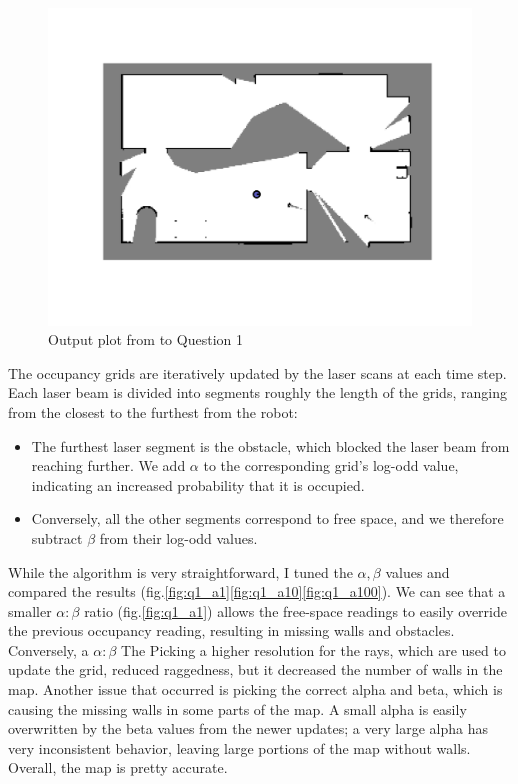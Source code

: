\documentclass{article} %
\begin{document}
\begin{figure}[hbt]
  \centering
    \includegraphics[width=1.0\textwidth]{ass2_q1.png}
  \caption{Output plot from to Question 1}
\end{figure}

The occupancy grids are iteratively updated by the laser scans at each time step. Each laser beam is divided into segments roughly the length of the grids, ranging from the closest to the furthest from the robot:
\begin{itemize}
  \item The furthest laser segment is the obstacle, which blocked the laser beam from reaching further. We add $\alpha$ to the corresponding grid's log-odd value, indicating an increased probability that it is occupied.
  \item Conversely, all the other segments correspond to free space, and we therefore subtract $\beta$ from their log-odd values.
\end{itemize}

While the algorithm is very straightforward, I tuned the $\alpha, \beta$ values and compared the results (fig.\ref{fig:q1_a1}\ref{fig:q1_a10}\ref{fig:q1_a100}). We can see that a smaller $\alpha:\beta$ ratio (fig.\ref{fig:q1_a1}) allows the free-space readings to easily override the previous occupancy reading, resulting in missing walls and obstacles. Conversely, a $\alpha:\beta$
The 
Picking a higher resolution for the rays, which are used to update the grid, reduced raggedness, but it decreased the number of walls in the map.
Another issue that occurred is picking the correct alpha and beta, which is causing the missing walls in some parts of the map. A small alpha is easily overwritten by the beta values from the newer updates; a very large alpha has very inconsistent behavior, leaving large portions of the map without walls.
Overall, the map is pretty accurate.
\end{document}
